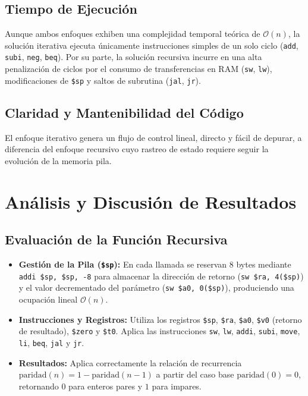 \documentclass[12pt,a4paper]{article}
\begin{document}
\subsection{Tiempo de Ejecución}
Aunque ambos enfoques exhiben una complejidad temporal teórica de $\mathcal{O}(n)$, la solución iterativa ejecuta únicamente instrucciones simples de un solo ciclo (\texttt{add}, \texttt{subi}, \texttt{neg}, \texttt{beq}). Por su parte, la solución recursiva incurre en una alta penalización de ciclos por el consumo de transferencias en RAM (\texttt{sw}, \texttt{lw}), modificaciones de \texttt{\$sp} y saltos de subrutina (\texttt{jal}, \texttt{jr}).

\subsection{Claridad y Mantenibilidad del Código}
El enfoque iterativo genera un flujo de control lineal, directo y fácil de depurar, a diferencia del enfoque recursivo cuyo rastreo de estado requiere seguir la evolución de la memoria pila.

\section{Análisis y Discusión de Resultados}

\subsection{Evaluación de la Función Recursiva}
\begin{itemize}
    \item \textbf{Gestión de la Pila (\texttt{\$sp}):} En cada llamada se reservan 8 bytes mediante \texttt{addi \$sp, \$sp, -8} para almacenar la dirección de retorno (\texttt{sw \$ra, 4(\$sp)}) y el valor decrementado del parámetro (\texttt{sw \$a0, 0(\$sp)}), produciendo una ocupación lineal $\mathcal{O}(n)$.
    \item \textbf{Instrucciones y Registros:} Utiliza los registros \texttt{\$sp}, \texttt{\$ra}, \texttt{\$a0}, \texttt{\$v0} (retorno de resultado), \texttt{\$zero} y \texttt{\$t0}. Aplica las instrucciones \texttt{sw}, \texttt{lw}, \texttt{addi}, \texttt{subi}, \texttt{move}, \texttt{li}, \texttt{beq}, \texttt{jal} y \texttt{jr}.
    \item \textbf{Resultados:} Aplica correctamente la relación de recurrencia $\text{paridad}(n) = 1 - \text{paridad}(n-1)$ a partir del caso base $\text{paridad}(0) = 0$, retornando $0$ para enteros pares y $1$ para impares.
\end{itemize}
\end{document}
